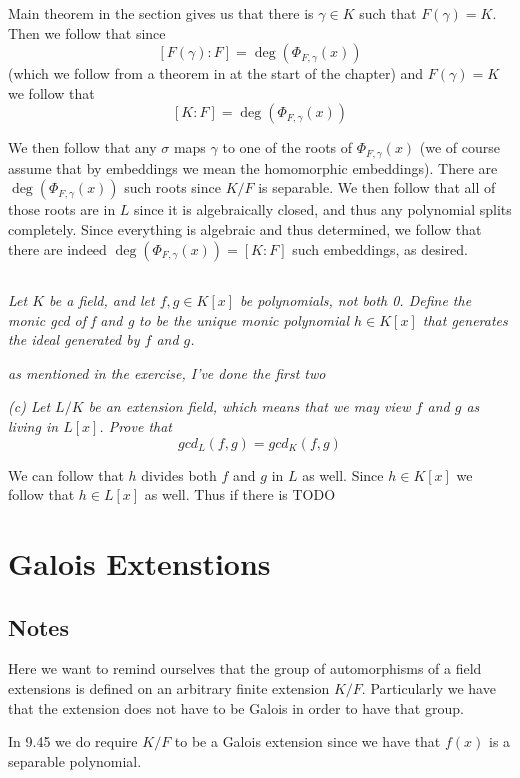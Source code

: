 \documentclass[11pt,oneside,titlepage]{book}
\begin{document}
Main theorem in the section gives us that there is $\gamma \in K$ such
that $F(\gamma) = K$. Then we follow that since
$$[F(\gamma): F] = \deg(\Phi_{F, \gamma}(x))$$
(which we follow from a theorem in at the start of the chapter) and
$F(\gamma) = K$ we follow that
$$[K: F] = \deg(\Phi_{F, \gamma}(x))$$

We then follow that any $\sigma$ maps $\gamma$ to one of the roots of
$\Phi_{F, \gamma}(x)$ (we of course assume that by embeddings we mean
the homomorphic embeddings). There are $\deg(\Phi_{F, \gamma}(x))$
such roots since $K/F$ is separable. We then follow that all of those
roots are in $L$ since it is algebraically closed, and thus any
polynomial splits completely. Since everything is algebraic and thus
determined, we follow that there are indeed $\deg(\Phi_{F, \gamma}(x))
= [K:F]$ such embeddings, as desired.


\subsection{}

\textit{Let $K$ be a field, and let $f, g \in K[x]$ be polynomials,
not both 0. Define the monic gcd of f and g to be the unique monic
polynomial $h \in K[x]$ that generates the ideal generated by $f$ and
$g$. }


\textit{as mentioned in the exercise, I've done the first two}

\textit{(c) Let $L/K$ be an extension field, which means that we may
view $f$ and $g$ as living in $L[x]$. Prove that
  $$gcd_L(f, g) = gcd_K(f, g)$$
}

We can follow that $h$ divides both $f$ and $g$ in $L$ as well. Since $h \in K[x]$ we
follow that $h \in L[x]$ as well. Thus if there is TODO

\section{Galois Extenstions}

\subsection*{Notes}

Here we want to remind ourselves that the group of automorphisms of a
field extensions is defined on an arbitrary finite extension
$K/F$. Particularly we have that the extension does not have to be
Galois in order to have that group.

In 9.45 we do require $K/F$ to be a Galois extension since we have that
$f(x)$ is a separable polynomial.
\end{document}
